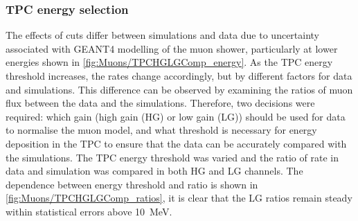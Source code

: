 \subsubsection{TPC energy selection}\label{sec:Muons/TPCEnergySelection}
The effects of cuts differ between simulations and data due to uncertainty associated with GEANT4 modelling of the muon shower, particularly at lower energies shown in \autoref{fig:Muons/TPCHGLGComp_energy}. As the TPC energy threshold increases, the rates change accordingly, but by different factors for data and simulations. This difference can be observed by examining the ratios of muon flux between the data and the simulations. Therefore, two decisions were required: which gain (high gain (HG) or low gain (LG)) should be used for data to normalise the muon model, and what threshold is necessary for energy deposition in the TPC to ensure that the data can be accurately compared with the simulations. The TPC energy threshold was varied and the ratio of rate in data and simulation was compared in both HG and LG channels. The dependence between energy threshold and ratio is shown in \autoref{fig:Muons/TPCHGLGComp_ratios}, it is clear that the LG ratios remain steady within statistical errors above 10~MeV.
